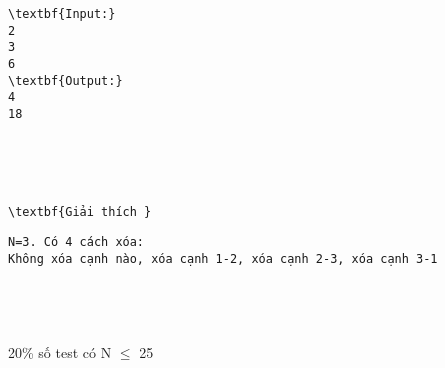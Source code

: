 \begin{verbatim}
\textbf{Input:}
2
3
6
\textbf{Output:}  
4
18\end{verbatim}

 

 
\begin{verbatim}
\textbf{Giải thích }\end{verbatim}
\begin{verbatim}
N=3. Có 4 cách xóa:
Không xóa cạnh nào, xóa cạnh 1-2, xóa cạnh 2-3, xóa cạnh 3-1 \end{verbatim}
\begin{verbatim}
 \end{verbatim}
\begin{verbatim}
 \end{verbatim}
20\% số test có N  $\le$  25